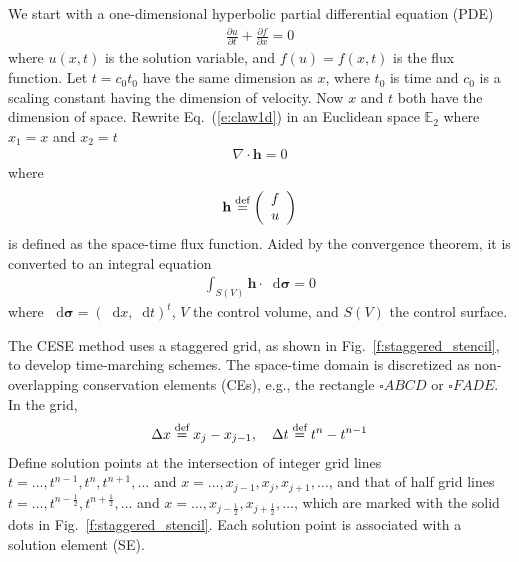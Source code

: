 \documentclass[a4paper,12pt,dvips]{article}
\newcommand*\diff{\mathop{}\!\mathrm{d}}
\newcommand*\defeq{\buildrel{\text{def}}\over{=}}
\begin{document}
We start with a one-dimensional hyperbolic partial differential equation (PDE)
\begin{align}
  \frac{\partial u}{\partial t} + \frac{\partial f}{\partial x} = 0
  \label{e:claw1d}
\end{align}
where $u(x, t)$ is the solution variable, and $f(u) = f(x, t)$ is the flux
function.  Let $t = c_0t_0$ have the same dimension as $x$, where $t_0$ is time
and $c_0$ is a scaling constant having the dimension of velocity.  Now $x$ and
$t$ both have the dimension of space.  Rewrite Eq.~(\ref{e:claw1d}) in an
Euclidean space $\mathbb{E}_2$ where $x_1 = x$ and $x_2 = t$
\begin{align*}
  \nabla \cdot \mathbf{h} = 0
\end{align*}
where
\begin{align*}
  \mathbf{h} \defeq \left(\begin{array}{c}
    f \\ u
  \end{array}\right)
\end{align*}
is defined as the space-time flux function.  Aided by the convergence theorem,
it is converted to an integral equation 
\begin{align}
  \int_{S(V)} \mathbf{h} \cdot \diff \boldsymbol\sigma = 0
  \label{e:claw1dint}
\end{align}
where $\diff\boldsymbol\sigma = (\diff x, \diff t)^t$, $V$ the control
volume, and $S(V)$ the control surface.

The CESE method uses a staggered grid, as shown in
Fig.~\ref{f:staggered_stencil}, to develop time-marching schemes.  The
space-time domain is discretized as non-overlapping conservation elements
(CEs), e.g., the rectangle $\square ABCD$ or $\square FADE$.  In the grid,
\begin{align*}
  \Delta x \defeq x_j - x_{j-1}, \quad \Delta t \defeq t^n - t^{n-1}
\end{align*}
Define solution points at the intersection of integer grid lines $t = \ldots,
t^{n-1}, t^n, t^{n+1}, \ldots$ and $x = \ldots, x_{j-1}, x_j, x_{j+1}, \ldots$,
and that of half grid lines $t = \ldots, t^{n-\frac{1}{2}}, t^{n+\frac{1}{2}},
\ldots$ and $x = \ldots, x_{j-\frac{1}{2}}, x_{j+\frac{1}{2}}, \ldots$, which
are marked with the solid dots in Fig.~\ref{f:staggered_stencil}.  Each
solution point is associated with a solution element (SE).
\end{document}
